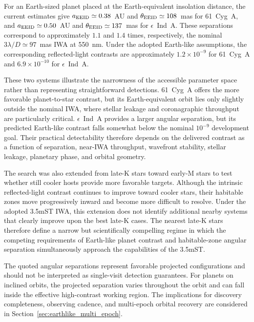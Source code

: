 For an Earth-sized planet placed at the Earth-equivalent insolation distance,
the current estimates give
$a_{\rm EEID}\simeq0.38$~AU and
$\theta_{\rm EEID}\simeq108$~mas for 61~Cyg~A, and
$a_{\rm EEID}\simeq0.50$~AU and
$\theta_{\rm EEID}\simeq137$~mas for $\epsilon$~Ind~A.
These separations correspond to approximately $1.1$ and $1.4$ times,
respectively, the nominal $3\lambda/D\simeq97$~mas IWA at 550~nm.
Under the adopted Earth-like assumptions, the corresponding reflected-light
contrasts are approximately $1.2\times10^{-9}$ for 61~Cyg~A and
$6.9\times10^{-10}$ for $\epsilon$~Ind~A.

These two systems illustrate the narrowness of the accessible parameter
space rather than representing straightforward detections. 61~Cyg~A offers
the more favorable planet-to-star contrast, but its Earth-equivalent orbit
lies only slightly outside the nominal IWA, where stellar leakage and
coronagraphic throughput are particularly critical. $\epsilon$~Ind~A
provides a larger angular separation, but its predicted Earth-like contrast
falls somewhat below the nominal $10^{-9}$ development goal. Their practical
detectability therefore depends on the delivered contrast as a function of
separation, near-IWA throughput, wavefront stability, stellar leakage,
planetary phase, and orbital geometry.

The search was also extended from late-K stars toward early-M stars to test
whether still cooler hosts provide more favorable targets. Although the
intrinsic reflected-light contrast continues to improve toward cooler stars,
their habitable zones move progressively inward and become more difficult to
resolve. Under the adopted 3.5mST IWA, this extension does not identify
additional nearby systems that clearly improve upon the best late-K cases.
The nearest late-K stars therefore define a narrow but scientifically
compelling regime in which the competing requirements of Earth-like
planet contrast and habitable-zone angular separation simultaneously
approach the capabilities of the 3.5mST.

The quoted angular separations represent favorable projected configurations
and should not be interpreted as single-visit detection guarantees.
For planets on inclined orbits, the projected separation varies throughout
the orbit and can fall inside the effective high-contrast working region.
The implications for discovery completeness, observing cadence, and
multi-epoch orbital recovery are considered in 
Section~\ref{sec:earthlike_multi_epoch}.


